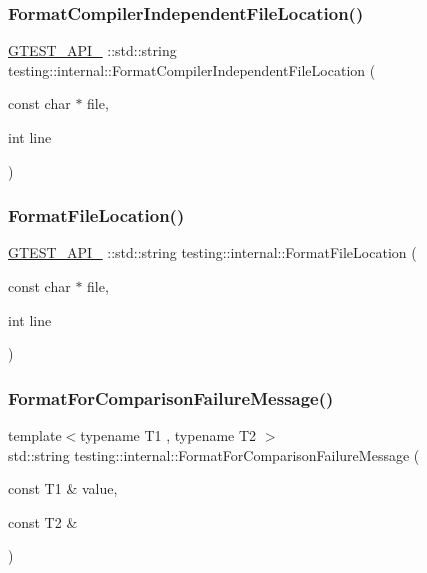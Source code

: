 \subsubsection{\texorpdfstring{FormatCompilerIndependentFileLocation()}{FormatCompilerIndependentFileLocation()}}
{\footnotesize\ttfamily \mbox{\hyperlink{gtest-port_8h_aa73be6f0ba4a7456180a94904ce17790}{G\+T\+E\+S\+T\+\_\+\+A\+P\+I\+\_\+}} \+::std\+::string testing\+::internal\+::\+Format\+Compiler\+Independent\+File\+Location (\begin{DoxyParamCaption}\item[{const char $\ast$}]{file,  }\item[{int}]{line }\end{DoxyParamCaption})}

\mbox{\label{namespacetesting_1_1internal_aea0ca448425df26e868a7d9447b9b7a1}} 
\subsubsection{\texorpdfstring{FormatFileLocation()}{FormatFileLocation()}}
{\footnotesize\ttfamily \mbox{\hyperlink{gtest-port_8h_aa73be6f0ba4a7456180a94904ce17790}{G\+T\+E\+S\+T\+\_\+\+A\+P\+I\+\_\+}} \+::std\+::string testing\+::internal\+::\+Format\+File\+Location (\begin{DoxyParamCaption}\item[{const char $\ast$}]{file,  }\item[{int}]{line }\end{DoxyParamCaption})}

\mbox{\label{namespacetesting_1_1internal_a91ab078f10adc669f09b7f604975c518}} 
\subsubsection{\texorpdfstring{FormatForComparisonFailureMessage()}{FormatForComparisonFailureMessage()}}
{\footnotesize\ttfamily template$<$typename T1 , typename T2 $>$ \\
std\+::string testing\+::internal\+::\+Format\+For\+Comparison\+Failure\+Message (\begin{DoxyParamCaption}\item[{const T1 \&}]{value,  }\item[{const T2 \&}]{ }\end{DoxyParamCaption})}

